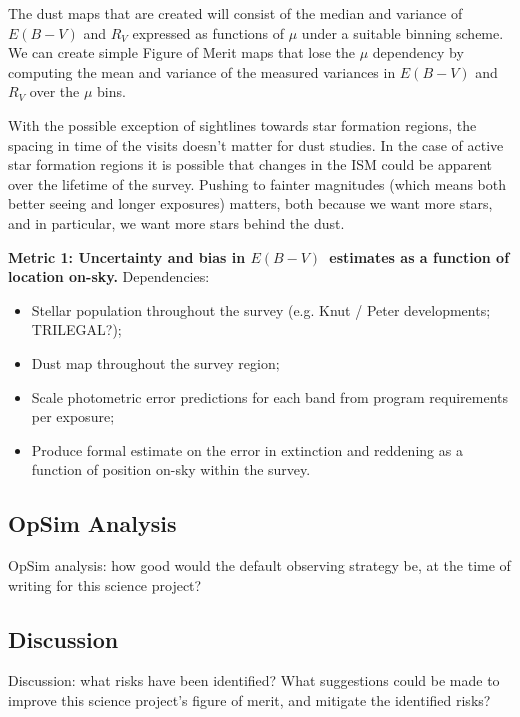The dust maps that are created will consist of the median and variance of $E(B-V)$ and $R_V$ expressed as functions of 
$\mu$ under a suitable binning scheme. We can create simple Figure of Merit maps that lose the 
$\mu$ dependency by computing the mean and variance of the measured variances in $E(B-V)$ and $R_V$ 
over the $\mu$ bins.

With the possible exception of sightlines towards star formation regions, the spacing in time of the visits 
doesn't matter for dust studies. In the case of active star formation regions it is possible that changes in the
ISM could be apparent over the lifetime of the survey.
Pushing to fainter magnitudes (which means both better seeing and longer exposures) matters, 
both because we want more stars, and in particular, we want more stars behind the dust.  


{\bf Metric 1: Uncertainty and bias in $E(B-V)$~estimates as a
  function of location on-sky.} Dependencies:

\begin{itemize}
  \item Stellar population throughout the survey (e.g. Knut / Peter developments; TRILEGAL?);
    \item Dust map throughout the survey region;
    \item Scale photometric error predictions for each band from program requirements per exposure;
      \item Produce formal estimate on the error in extinction and reddening as a function of position on-sky within the survey.
\end{itemize}



\subsection{OpSim Analysis}
\label{sec:\secname:analysis}

OpSim analysis: how good would the default observing strategy be, at
the time of writing for this science project?



\subsection{Discussion}
\label{sec:\secname:discussion}

Discussion: what risks have been identified? What suggestions could be
made to improve this science project's figure of merit, and mitigate
the identified risks?



\navigationbar
